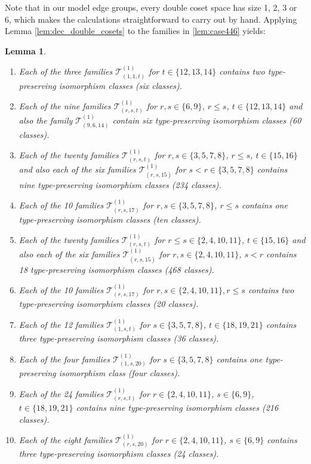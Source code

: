 \documentclass[dvipsnames]{article}
\newtheorem{lemma}[theorem]{Lemma}
\theoremstyle{definition}
\theoremstyle{remark}
\begin{document}
    Note that in our model edge groups, every double coset space has size 1, 2, 3 or 6, which makes the calculations straightforward to carry out by hand.
    Applying Lemma \ref{lem:dec_double_cosets} to the families in \ref{lem:case446} yields:
    \begin{lemma}\label{lem:dec_446}
        \begin{enumerate}
            \item Each of the three families $\mathcal T_{(1,1,t)}^{(1)}$ for $t \in \{12,13,14\}$ contains two type-preserving isomorphism classes (six classes).
            \item Each of the nine families $\mathcal T_{(r,s,t)}^{(1)}$ for $r,s \in \{6,9\}$, $r\leq s$, $t \in \{12,13,14\}$ and also the family $\mathcal T_{(9,6,14)}^{(1)}$ contain six type-preserving isomorphism classes (60 classes).
            \item Each of the twenty families $\mathcal T_{(r,s,t)}^{(1)}$ for $r,s \in \{3,5,7,8\}$, $r\leq s$, $t \in \{15,16\}$ and also each of the six families $\mathcal T_{(r,s,15)}^{(1)}$ for $s < r \in \{3,5,7,8\}$ contains nine type-preserving isomorphism classes (234 classes).
            \item Each of the 10 families $\mathcal T_{(r,s,17)}^{(1)}$ for $r,s \in \{3,5,7,8\}$, $r\leq s$ contains one type-preserving isomorphism classes (ten classes).
            \item Each of the twenty families $\mathcal T_{(r,s,t)}^{(1)}$ for $r\leq s \in \{2,4,10,11\}$, $t \in \{15,16\}$ and also each of the six families $\mathcal T_{(r,s,15)}^{(1)}$ for $r,s \in \{2,4,10,11\}$, $s < r$ contains 18 type-preserving isomorphism classes (468 classes).
            \item Each of the 10 families $\mathcal T_{(r,s,17)}^{(1)}$ for $r,s \in \{2,4,10,11\}, r\leq s$ contains two type-preserving isomorphism classes (20 classes).
            \item Each of the 12 families $\mathcal T_{(1,s,t)}^{(1)}$ for $s \in \{3,5,7,8\}$, $t \in \{18,19,21\}$ contains three type-preserving isomorphism classes (36 classes).
            \item Each of the four families $\mathcal T_{(1,s,20)}^{(1)}$ for $s \in \{3,5,7,8\}$ contains one type-preserving isomorphism class (four classes).
            \item Each of the 24 families $\mathcal T_{(r,s,t)}^{(1)}$ for $r\in \{2,4,10,11\}$, $s\in \{6,9\}$, $t \in \{18,19,21\}$ contains nine type-preserving isomorphism classes (216 classes).
            \item Each of the eight families $\mathcal T_{(r,s,20)}^{(1)}$ for $r\in \{2,4,10,11\}$, $s\in \{6,9\}$ contains three type-preserving isomorphism classes (24 classes).   
        \end{enumerate}
    \end{lemma}
\end{document}

